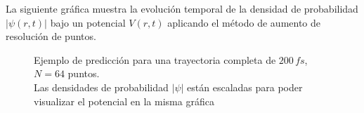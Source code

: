 La siguiente gráfica muestra la evolución temporal de la densidad de probabilidad $|\psi(r,t)|$ bajo un potencial $V(r,t)$ aplicando el método de aumento de resolución de puntos.

\begin{figure}[H]
  \centering
  \caption{Ejemplo de predicción para una trayectoria completa de $200\,fs$, $N=64$ puntos.\\ Las densidades de probabilidad $|\psi|$ están escaladas para poder visualizar el potencial en la misma gráfica}
  \label{fig:trajec1_64}
\end{figure}

